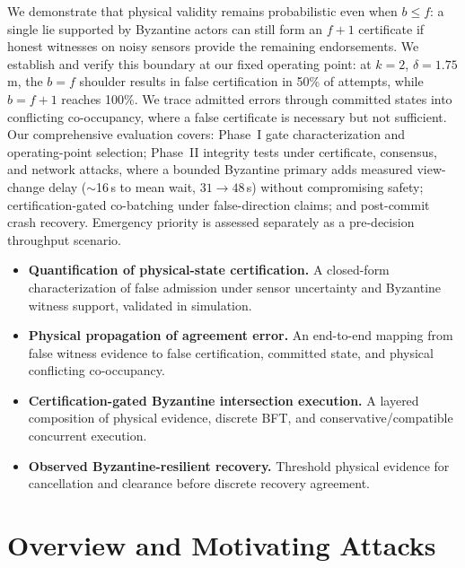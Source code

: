 \documentclass[letterpaper,10pt,conference]{IEEEtran}
\begin{document}
We demonstrate that physical validity remains probabilistic even when
$b \le f$: a single lie supported by Byzantine actors can still form an
$f{+}1$ certificate if honest witnesses on noisy sensors provide the
remaining endorsements. We establish and verify this boundary at our
fixed operating point: at $k=2$, $\delta = 1.75$\,m, the $b=f$ shoulder
results in false certification in 50\% of attempts, while $b = f{+}1$ reaches 100\%. We trace admitted errors through committed states into conflicting co-occupancy, where a
false certificate is necessary but not sufficient. Our comprehensive
evaluation covers: Phase~I gate characterization and operating-point
selection; Phase~II integrity tests under certificate, consensus, and
network attacks, where a bounded Byzantine primary adds measured
view-change delay ($\sim$16\,s to mean wait, $31 \to 48$\,s) without
compromising safety; certification-gated co-batching under
false-direction claims; and post-commit crash recovery. Emergency
priority is assessed separately as a pre-decision throughput scenario.


\begin{itemize}

\item \textbf{Quantification of physical-state certification.}
      A closed-form characterization of false admission under sensor
      uncertainty and Byzantine witness support, validated in simulation.

\item \textbf{Physical propagation of agreement error.}
      An end-to-end mapping from false witness evidence to false
      certification, committed state, and physical conflicting co-occupancy. 

\item \textbf{Certification-gated Byzantine intersection execution.}
      A layered composition of physical evidence, discrete BFT, and
      conservative/compatible concurrent execution.

\item \textbf{Observed Byzantine-resilient recovery.}
      Threshold physical evidence for cancellation and clearance before
      discrete recovery agreement.

\end{itemize}



\section{Overview and Motivating Attacks}
\label{sec:overview}
\end{document}
